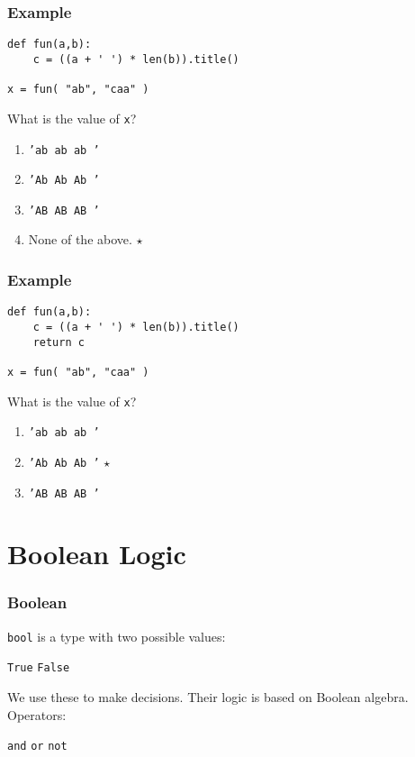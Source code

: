 \documentclass[11pt]{beamer}
\begin{document}
\begin{frame}[fragile]
  \frametitle{Example}
  \Enlarge

  \begin{Verbatim}[commandchars=\\\{\},commentchar=\%]
def fun(a,b):
    c = ((a + ' ') * len(b)).title()

x = fun( "ab", "caa" )
  \end{Verbatim}
  What is the value of \texttt{x}?
  \begin{enumerate}[label=\Alph*]
  \item  \texttt{'ab ab ab '}
  \item  \texttt{'Ab Ab Ab '}
  \item  \texttt{'AB AB AB '}
  \item  None of the above.  $\star$
  \end{enumerate}
\end{frame}

\begin{frame}[fragile]
  \frametitle{Example}
  \Enlarge

  \begin{Verbatim}[commandchars=\\\{\},commentchar=\%]
def fun(a,b):
    c = ((a + ' ') * len(b)).title()
    return c

x = fun( "ab", "caa" )
  \end{Verbatim}
  What is the value of \texttt{x}?
  \begin{enumerate}[label=\Alph*]
  \item  \texttt{'ab ab ab '}
  \item  \texttt{'Ab Ab Ab '}  $\star$
  \item  \texttt{'AB AB AB '}
  \end{enumerate}
\end{frame}

\section{Boolean Logic}

\begin{frame}[fragile]
  \frametitle{Boolean}
  \Enlarge

  \begin{itemize}
  \myitem  \texttt{bool} is a type with two possible values:
    \begin{itemize}
    \mysubitem  \texttt{True}
    \mysubitem  \texttt{False}
    \end{itemize} %
  \myitem  We use these to make decisions.
  \myitem  Their logic is based on Boolean algebra. %
  \myitem  Operators:
    \begin{itemize}
    \mysubitem  \texttt{and}
    \mysubitem  \texttt{or}
    \mysubitem  \texttt{not}
    \end{itemize}
  \end{itemize}
\end{frame}
\end{document}
